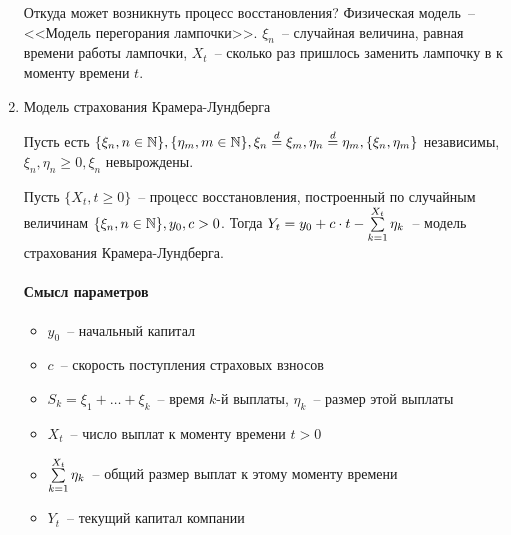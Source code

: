 \begin{enumerate}
Откуда может возникнуть процесс восстановления?
Физическая модель~-- <<Модель перегорания лампочки>>. $\xi_n$~-- случайная величина, равная времени работы лампочки, $X_t$~-- сколько раз пришлось заменить лампочку в к моменту времени $t$.

\item Модель страхования Крамера-Лундберга

Пусть есть $\{\xi_n, n \in \mathbb{N}\}, \{\eta_m, m \in \mathbb{N}\},
\xi_n \overset{d}{=} \xi_m,
\eta_n \overset{d}{=} \eta_m,
\{\xi_n, \eta_m\}$ независимы,
$\xi_n, \eta_n \geq 0, \xi_n$ невырождены.

Пусть $\{X_t, t \geq 0\}$~-- процесс восстановления, построенный по случайным величинам
$\{\xi_n, n \in \mathbb{N}\}, y_0, c > 0$. Тогда
$Y_t = y_0 + c \cdot t - \sum\limits_{k=1}^{X_t} \eta_k$~--
модель страхования Крамера-Лундберга.

\paragraph*{Смысл параметров}
\begin{itemize}
\item $y_0$~-- начальный капитал
\item $c$~-- скорость поступления страховых взносов
\item $S_k = \xi_1 + \dots + \xi_k$~-- время $k$-й выплаты, $\eta_k$~-- размер этой выплаты
\item $X_t$~-- число выплат к моменту времени $t > 0$
\item $\sum\limits_{k=1}^{X_t} \eta_k$~-- общий размер выплат к этому моменту времени
\item $Y_t$~-- текущий капитал компании
\end{itemize}
\end{enumerate}

\ifdefined\Main\else

\fi
